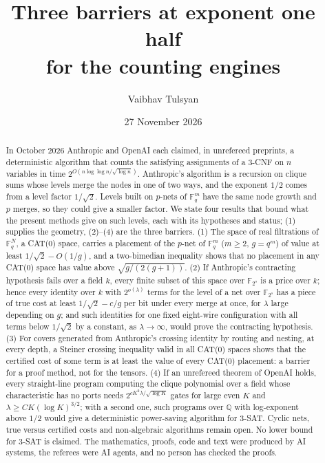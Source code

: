 \documentclass[10pt]{amsart}
\theoremstyle{plain}
\theoremstyle{definition}
\theoremstyle{remark}
\numberwithin{equation}{section}
\newcommand{\F}{\mathbb{F}}
\newcommand{\Q}{\mathbb{Q}}
\begin{document}
\title[Three barriers at exponent one half]{Three barriers at exponent one half\\ for the counting engines}

\author{Vaibhav Tulsyan}

\date{27 November 2026}


\begin{abstract}
In October 2026 Anthropic and OpenAI each claimed, in unrefereed preprints, a deterministic
algorithm that counts the satisfying assignments of a 3-CNF on $n$ variables in time
$2^{O(n\log\log n/\sqrt{\log n})}$. Anthropic's algorithm is a recursion on clique sums whose levels
merge the nodes in one of two ways, and the exponent $1/2$ comes from a level factor $1/\sqrt2$.
Levels built on $p$-nets of $\F_q^m$ have the same node growth and $p$ merges, so they could give a
smaller factor. We state four results that bound what the present methods give on such levels, each
with its hypotheses and status; (1) supplies the geometry, (2)--(4) are the three barriers.
(1) The space of real filtrations of $\F_q^N$, a CAT(0) space, carries a placement of the $p$-net
of $\F_q^m$ ($m\ge2$, $g=q^m$) of value at least $1/\sqrt2-O(1/g)$, and a two-bimedian inequality
shows that no placement in any CAT(0) space has value above $\sqrt{g/(2(g+1))}$. (2) If Anthropic's
contracting hypothesis fails over a field $k$, every finite subset of this space over $\F_{2^s}$ is
a price over $k$; hence every identity over $k$ with $2^{o(\lambda)}$ terms for the level of a net over
$\F_{2^s}$ has a piece of true cost at least $1/\sqrt2-c/g$ per bit under every merge at once, for
$\lambda$ large depending on $g$; and such identities for one fixed eight-wire configuration with all
terms below $1/\sqrt2$ by a constant, as $\lambda\to\infty$, would prove the contracting hypothesis.
(3) For covers generated from Anthropic's crossing identity by routing and nesting, at every depth, a
Steiner crossing inequality valid in all CAT(0) spaces shows that the certified cost of some term is
at least the value of every CAT(0) placement: a barrier for a proof method, not for the tensors.
(4) If an unrefereed theorem of OpenAI holds, every straight-line program computing the clique
polynomial over a field whose characteristic has no ports needs $2^{cK^2\lambda/\sqrt{\log K}}$ gates
for large even $K$ and $\lambda\ge CK(\log K)^{3/2}$; with a second one, such programs over $\Q$ with
log-exponent above $1/2$ would give a deterministic power-saving algorithm for 3-SAT. Cyclic nets,
true versus certified costs and non-algebraic algorithms remain open. No lower bound for 3-SAT is
claimed. The mathematics, proofs, code and text were produced by AI systems, the referees were AI
agents, and no person has checked the proofs.
\end{abstract}
\end{document}
